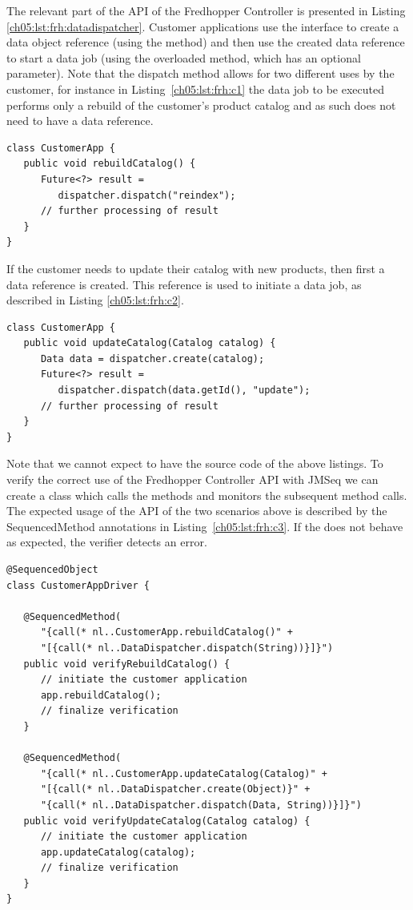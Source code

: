 The relevant part of the API of the Fredhopper Controller is presented in Listing \ref{ch05:lst:frh:datadispatcher}.
Customer applications use the interface to create a data object reference (using the  method) and then use the created data reference to start a data job (using the overloaded  method, which has an optional  parameter).
Note that the dispatch method allows for two different uses by the customer, for instance in Listing~\ref{ch05:lst:frh:c1} the data job to be executed performs only a rebuild of the customer's product catalog and as such does not need to have a data reference.
\lstset{language=java}
\begin{lstlisting}[label=ch05:lst:frh:c1, caption=A use case with no data requirement]
class CustomerApp {
   public void rebuildCatalog() {
      Future<?> result = 
         dispatcher.dispatch("reindex");
      // further processing of result
   }
}
\end{lstlisting}
If the customer needs to update their catalog with new products, then first a data reference is created. This reference is used to initiate a data job, as described in Listing \ref{ch05:lst:frh:c2}.
\lstset{language=java}
\begin{lstlisting}[label=ch05:lst:frh:c2, caption=A use case with data requirement]
class CustomerApp {
   public void updateCatalog(Catalog catalog) {
      Data data = dispatcher.create(catalog);
      Future<?> result = 
         dispatcher.dispatch(data.getId(), "update");
      // further processing of result
   }
}
\end{lstlisting}

Note that we cannot expect to have the source code of the above listings.  To verify the correct use of the Fredhopper Controller API
with JMSeq we can create a  class which calls the  methods and monitors the subsequent
method calls.  The expected usage of the API of the two scenarios above is described by the SequencedMethod annotations in Listing~\ref{ch05:lst:frh:c3}.
If the  does not behave as expected, the verifier detects an error.

\lstset{language=java}
\begin{lstlisting}[float=t,label=ch05:lst:frh:c3, caption=How to verify Fredhopper API usage]
@SequencedObject
class CustomerAppDriver {

   @SequencedMethod(
      "{call(* nl..CustomerApp.rebuildCatalog()" +
      "[{call(* nl..DataDispatcher.dispatch(String))}]}")
   public void verifyRebuildCatalog() {
      // initiate the customer application
      app.rebuildCatalog();
      // finalize verification
   }

   @SequencedMethod(
      "{call(* nl..CustomerApp.updateCatalog(Catalog)" +
      "[{call(* nl..DataDispatcher.create(Object)}" + 
      "{call(* nl..DataDispatcher.dispatch(Data, String))}]}")
   public void verifyUpdateCatalog(Catalog catalog) {
      // initiate the customer application
      app.updateCatalog(catalog);
      // finalize verification 
   }
}
\end{lstlisting}

